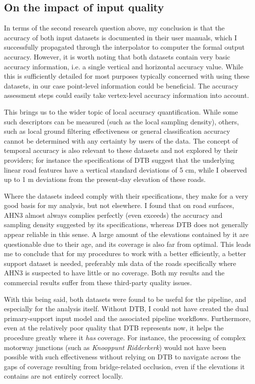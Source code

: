 \subsection{On the impact of input quality}
\label{sub:usefulnessquality}

In terms of the second research question above, my conclusion is that the accuracy of both input datasets is documented in their user manuals, which I successfully propagated through the interpolator to computer the formal output accuracy. However, it is worth noting that both datasets contain very basic accuracy information, i.e. a single vertical and horizontal accuracy value. While this is sufficiently detailed for most purposes typically concerned with using these datasets, in our case point-level information could be beneficial. The accuracy assessment steps could easily take vertex-level accuracy information into account.

This brings us to the wider topic of local accuracy quantification. While some such descriptors can be measured (such as the local sampling density), others, such as local ground filtering effectiveness or general classification accuracy cannot be determined with any certainty by users of the data. The concept of temporal accuracy is also relevant to these datasets and not explored by their providers; for instance the specifications of DTB suggest that the underlying linear road features have a vertical standard deviations of 5 cm, while I observed up to 1 m deviations from the present-day elevation of these roads.

Where the datasets indeed comply with their specifications, they make for a very good basis for my analysis, but not elsewhere. I found that on road surfaces, AHN3 almost always complies perfectly (even exceeds) the accuracy and sampling density suggested by its specifications, whereas DTB does not generally appear reliable in this sense. A large amount of the elevations contained by it are questionable due to their age, and its coverage is also far from optimal. This leads me to conclude that for my procedures to work with a better efficiently, a better support dataset is needed, preferably \ac{mls} data of the roads specifically where AHN3 is suspected to have little or no coverage. Both my results and the commercial results suffer from these third-party quality issues.

With this being said, both datasets were found to be useful for the pipeline, and especially for the analysis itself. Without DTB, I could not have created the dual primary-support input model and the associated pipeline workflows. Furthermore, even at the relatively poor quality that DTB represents now, it helps the procedure greatly where it \textit{has} coverage. For instance, the processing of complex motorway junctions (such as \textit{Knooppunt Ridderkerk}) would not have been possible with such effectiveness without relying on DTB to navigate across the gaps of coverage resulting from bridge-related occlusion, even if the elevations it contains are not entirely correct locally.

